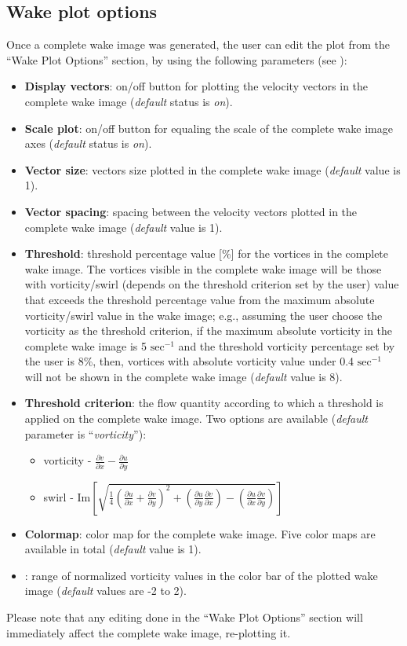\documentclass[12pt,a4paper]{article}
\begin{document}
 
\subsection{Wake plot options}
Once a complete wake image was generated, the user can edit the plot from the ``Wake Plot Options'' section, by using the following parameters (see ):
\begin{itemize}
	\item \textbf{Display vectors}: on/off button for plotting the velocity vectors in the complete wake image (\textit{default} status is \textit{on}).
	\item \textbf{Scale plot}: on/off button for equaling the scale of the complete wake image axes (\textit{default} status is \textit{on}).
	\item \textbf{Vector size}: vectors size plotted in the complete wake image (\textit{default} value is 1).
	\item \textbf{Vector spacing}: spacing between the velocity vectors plotted in the complete wake image (\textit{default} value is 1).
	\item \textbf{Threshold}: threshold percentage value [\%] for the vortices in the complete wake image. The vortices visible in the complete wake image will be those with vorticity/swirl (depends on the threshold criterion set by the user) value that exceeds the threshold percentage value from the maximum absolute vorticity/swirl value in the wake image; e.g., assuming the user choose the vorticity as the threshold criterion, if the maximum absolute vorticity in the complete wake image is 5 $\mathrm{sec^{-1}}$ and the threshold vorticity percentage set by the user is 8\%, then, vortices with absolute vorticity value under 0.4 $\mathrm{sec^{-1}}$ will not be shown in the complete wake image (\textit{default} value is 8).
	\item \textbf{Threshold criterion}: the flow quantity according to which a threshold is applied on the complete wake image. Two options are available (\textit{default} parameter is ``\textit{vorticity}''): 
	\begin{itemize}
		\item vorticity - $\frac{\partial v}{\partial x} - \frac{\partial u}{\partial y}$
		\item swirl - $\bm{\mathrm{Im}}\left[ \sqrt{ \frac{1}{4}\left(\frac{\partial u}{\partial x} + \frac{\partial v}{\partial y}\right)^2+ \left(\frac{\partial u}{\partial y} \frac{\partial v}{\partial x} \right) - \left(\frac{\partial u}{\partial x} \frac{\partial v}{\partial y} \right)}  \right]$ 
	\end{itemize}
	\item \textbf{Colormap}: color map for the complete wake image. Five color maps are available in total (\textit{default} value is 1).
	\item {}: range of normalized vorticity values in the color bar of the plotted wake image (\textit{default} values are -2 to 2).
\end{itemize}
Please note that any editing done in the ``Wake Plot Options'' section will immediately affect the complete wake image, re-plotting it.
\end{document}
